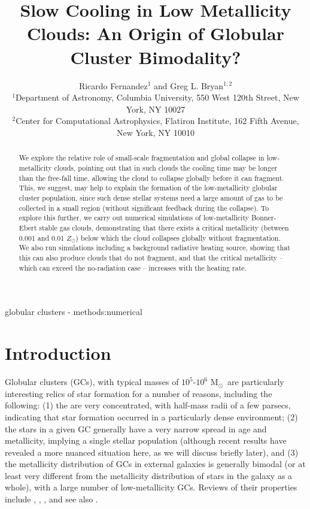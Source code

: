 \documentclass[useAMS,usenatbib]{mn2e}
\title{Slow Cooling in Low Metallicity Clouds: An Origin of Globular Cluster Bimodality?}
\author[R. Fernandez et al.]{Ricardo Fernandez$^{1}$ and Greg L. Bryan$^{1,2}$\\
$^{1}$Department of Astronomy, Columbia University, 550 West 120th Street, New York, NY 10027 \\
$^{2}$Center for Computational Astrophysics, Flatiron Institute, 162 Fifth Avenue, New York, NY 10010}
\newcommand{\msun}{{M$_\odot$}}
\begin{document}
\date{}


\maketitle


\begin{abstract}

We explore the relative role of small-scale fragmentation and global collapse in low-metallicity clouds, pointing out that in such clouds the cooling time may be longer than the free-fall time, allowing the cloud to collapse globally before it can fragment.  This, we suggest, may help to explain the formation of the low-metallicity globular cluster population, since such dense stellar systems need a large amount of gas to be collected in a small region (without significant feedback during the collapse).  To explore this further, we carry out numerical simulations of low-metallicity Bonner-Ebert stable gas clouds, demonstrating that there exists a critical metallicity (between 0.001 and 0.01 $Z_\odot$) below which the cloud collapses globally without fragmentation.  We also run simulations including a background radiative heating source, showing that this can also produce clouds that do not fragment, and that the critical metallicity -- which can exceed the no-radiation case -- increases with the heating rate.

\end{abstract}

\begin{keywords}
globular clusters - methods:numerical
\end{keywords}

%
\section{Introduction}

Globular clusters (GCs), with typical masses of $10^5$-$10^6$ \msun\ are particularly interesting relics of star formation for a number of reasons, including the following: (1) the are very concentrated, with half-mass radii of a few parsecs, indicating that star formation occurred in a particularly dense environment; (2) the stars in a given GC generally have a very narrow spread in age and metallicity, implying a single stellar population (although recent results have revealed a more nuanced situation here, as we will discuss briefly later), and (3) the metallicity distribution of GCs in external galaxies is generally bimodal (or at least very different from the metallicity distribution of stars in the galaxy as a whole), with a large number of low-metallicity GCs.  Reviews of their properties include \citet{Brodie2006}, \citet{Renzini2008, Renzini2013}, \citet{Kruijssen2014Review}, and see also \cite{zwart2010}.
\end{document}
